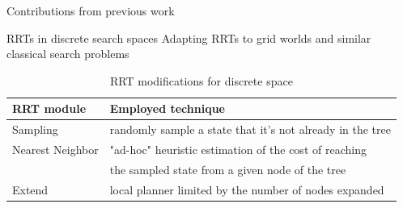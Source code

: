 \documentclass[10pt, xcolor=table]{beamer}
\begin{document}
\begin{frame}{Contributions from previous work}
\begin{exampleblock}{RRTs in discrete search spaces\cite{morgan2004sampling}}
Adapting RRTs to grid worlds and similar classical search problems
\vspace{0.5cm}
\begin{table}[H]
\begin{flushleft}
\caption{RRT modifications for discrete space}
\vspace{-0.5cm}
\begin{tabular}{|l|l|}
\hline
\rowcolor[HTML]{34696D} 
{\color[HTML]{000000} \textbf{RRT module}} & {\color[HTML]{000000} \textbf{Employed technique}}        \\ \hline
Sampling                                   & randomly sample a state that it's not already in the tree \\ \hline
Nearest Neighbor                           & "ad-hoc" heuristic estimation of the cost of reaching     \\
                                           & the sampled state from a given node of the tree           \\ \hline
Extend                                     & local planner limited by the number of nodes expanded     \\ \hline
\end{tabular}
\end{flushleft}
\end{table}
\end{exampleblock}
\end{frame}
\end{document}

